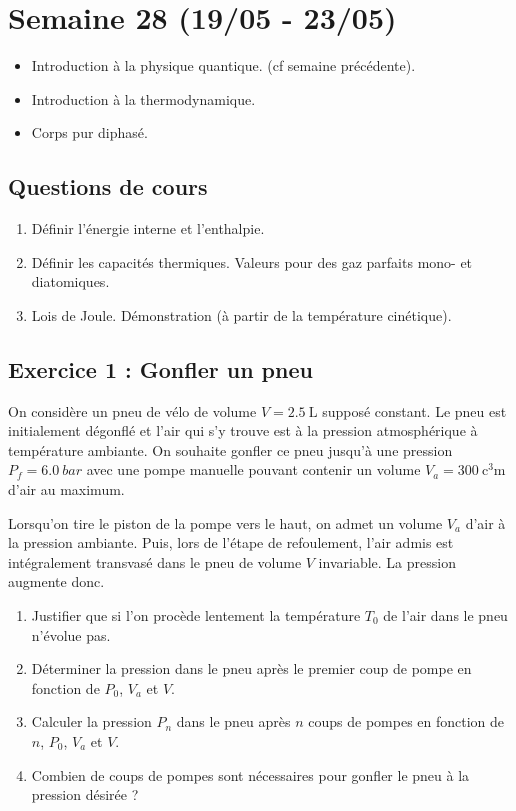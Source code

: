 \section{Semaine 28 (19/05 - 23/05) }


\begin{itemize}
	\item Introduction à la physique quantique. (cf semaine précédente).
	\item Introduction à la thermodynamique.
	\item Corps pur diphasé.
\end{itemize}

\subsection{Questions de cours}

\begin{enumerate}
	\item Définir l'énergie interne et l'enthalpie.
	\item Définir les capacités thermiques. Valeurs pour des gaz parfaits mono- et diatomiques.
	\item Lois de Joule. Démonstration (à partir de la température cinétique).
\end{enumerate}

\subsection{Exercice 1 : Gonfler un pneu}

On considère un pneu de vélo de volume $V = \SI{2.5}{\liter}$ supposé constant. Le pneu est initialement dégonflé et l'air qui s'y trouve est à la pression atmosphérique à température ambiante. On souhaite gonfler ce pneu jusqu'à une pression $P_f = \SI{6.0}{bar}$ avec une pompe manuelle pouvant contenir un volume $V_a = \SI{300}{\cubic\centi\meter}$ d'air au maximum.

Lorsqu'on tire le piston de la pompe vers le haut, on admet un volume $V_a$ d'air à la pression ambiante. Puis, lors de l'étape de refoulement, l'air admis est intégralement transvasé dans le pneu de volume $V$ invariable. La pression augmente donc.

\begin{enumerate}
	\item Justifier que si l'on procède lentement la température $T_0$ de l'air dans le pneu n'évolue pas.
	\item Déterminer la pression dans le pneu après le premier coup de pompe en fonction de $P_0$, $V_a$ et $V$.
	\item Calculer la pression $P_n$ dans le pneu après $n$ coups de pompes en fonction de $n$, $P_0$, $V_a$ et $V$.
	\item Combien de coups de pompes sont nécessaires pour gonfler le pneu à la pression désirée ?
\end{enumerate}

